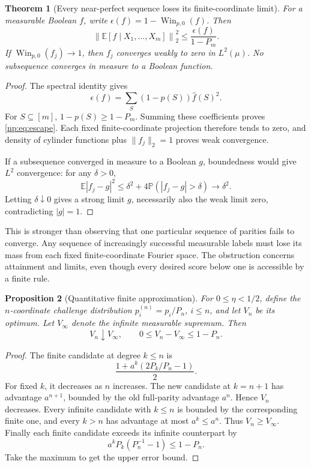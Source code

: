 \documentclass[11pt,a4paper]{article}
\newtheorem{theorem}{Theorem}[section]
\newtheorem{proposition}[theorem]{Proposition}
\theoremstyle{definition}
\theoremstyle{remark}
\newcommand{\E}{\mathbb E}
\newcommand{\Pbb}{\mathbb P}
\newcommand{\Win}{\operatorname{Win}}
\begin{document}
\begin{theorem}[Every near-perfect sequence loses its finite-coordinate limit]
\label{np:thm:escape}
For a measurable Boolean \(f\), write
\(\epsilon(f)=1-\Win_{p,0}(f)\). Then
\begin{equation}\label{np:eq:escape}
 \left\|\E[f\mid X_1,\ldots,X_m]\right\|_2^2
 \le\frac{\epsilon(f)}{1-P_m}.
\end{equation}
If \(\Win_{p,0}(f_j)\to1\), then \(f_j\) converges weakly to zero in
\(L^2(\mu)\). No subsequence converges in measure to a Boolean function.
\end{theorem}
\begin{proof}
The spectral identity gives
\[
 \epsilon(f)=\sum_S(1-p(S))\widehat f(S)^2.
\]
For \(S\subseteq[m]\), \(1-p(S)\ge1-P_m\). Summing these coefficients
proves \eqref{np:eq:escape}. Each fixed finite-coordinate projection
therefore tends to zero, and density of cylinder functions plus
\(\|f_j\|_2=1\) proves weak convergence.

If a subsequence converged in measure to a Boolean \(g\), boundedness
would give \(L^2\) convergence: for any \(\delta>0\),
\[
 \E|f_j-g|^2\le\delta^2+
 4\Pbb(|f_j-g|>\delta)\longrightarrow\delta^2.
\]
Letting \(\delta\downarrow0\) gives a strong limit \(g\), necessarily
also the weak limit zero, contradicting \(|g|=1\).
\end{proof}

This is stronger than observing that one particular sequence of parities
fails to converge. Any sequence of increasingly successful measurable
labels must lose its mass from each fixed finite-coordinate Fourier
space. The obstruction concerns attainment and limits, even though every
desired score below one is accessible by a finite rule.

\begin{proposition}[Quantitative finite approximation]
\label{np:prop:truncation}
For \(0\le\eta<1/2\), define the \(n\)-coordinate challenge distribution
\(p_i^{(n)}=p_i/P_n\), \(i\le n\), and let \(V_n\) be its optimum.
Let \(V_\infty\) denote the infinite measurable supremum.
Then
\[
 V_n\downarrow V_\infty,\qquad
 0\le V_n-V_\infty\le1-P_n.
\]
\end{proposition}
\begin{proof}
The finite candidate at degree \(k\le n\) is
\[
 \frac{1+a^k(2P_k/P_n-1)}2.
\]
For fixed \(k\), it decreases as \(n\) increases. The new candidate
at \(k=n+1\) has advantage \(a^{n+1}\), bounded by the old full-parity
advantage \(a^n\). Hence \(V_n\) decreases.
Every infinite candidate with \(k\le n\) is bounded by the corresponding
finite one, and every \(k>n\) has advantage at most \(a^k\le a^n\).
Thus \(V_n\ge V_\infty\).
Finally each finite candidate exceeds its infinite counterpart by
\[
 a^kP_k(P_n^{-1}-1)\le1-P_n.
\]
Take the maximum to get the upper error bound.
\end{proof}
\end{document}
